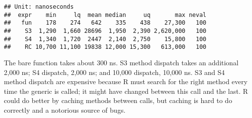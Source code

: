 \begin{Shaded}
\begin{Highlighting}[]
\StringTok{ }

\StringTok{ }\NormalTok{(}\NormalTok{)}
\StringTok{ }

\StringTok{ }\NormalTok{(}\NormalTok{, }\NormalTok{(} \NormalTok{))}
\NormalTok{(}\NormalTok{, }\NormalTok{(}\NormalTok{))}

\StringTok{ }\NormalTok{(}\NormalTok{, } \NormalTok{(}

\StringTok{ }\NormalTok{()}
\StringTok{ }\OperatorTok{$}\NormalTok{()}
\end{Highlighting}
\end{Shaded}

\begin{Shaded}
\begin{Highlighting}[]
\NormalTok{(}
   \NormalTok{(),}
   
   
  \OperatorTok{$}\NormalTok{()}
\NormalTok{)}
\end{Highlighting}
\end{Shaded}

\begin{verbatim}
## Unit: nanoseconds
##  expr    min     lq  mean median     uq       max neval
##   fun    178    274   642    335    438    27,300   100
##    S3  1,290  1,660 28696  1,950  2,390 2,620,000   100
##    S4  1,340  1,720  2447  2,140  2,750    15,800   100
##    RC 10,700 11,100 19838 12,000 15,300   613,000   100
\end{verbatim}

The bare function takes about 300 ns. S3 method dispatch takes an
additional 2,000 ns; S4 dispatch, 2,000 ns; and 10,000 dispatch, 10,000
ns. S3 and S4 method dispatch are expensive because R must search for
the right method every time the generic is called; it might have changed
between this call and the last. R could do better by caching methods
between calls, but caching is hard to do correctly and a notorious
source of bugs.

